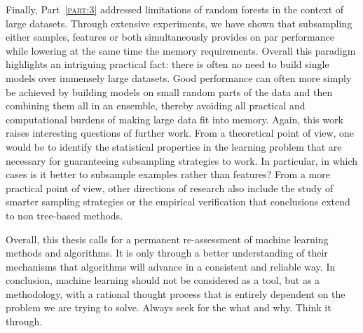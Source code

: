 Finally, Part~\textsc{\ref{part:3}} addressed limitations of random forests in
the context of large datasets. Through extensive experiments, we have shown
that subsampling either samples, features or both simultaneously provides on
par performance while lowering at the same time the memory requirements.
Overall this paradigm highlights an intriguing practical fact: there is often
no need to build single models over immensely large datasets. Good performance
can often more simply be achieved by building models on small random parts of the
data and then combining them all in an ensemble, thereby avoiding all practical and
computational burdens of making large data fit into memory. Again, this work
raises interesting questions of further work. From a theoretical point of view,
one would be to identify the statistical properties in the learning problem
that are necessary for guaranteeing subsampling strategies to work. In
particular, in which cases is it better to subsample examples rather than
features? From a more practical point of view, other directions of research
also include the study of smarter sampling strategies or the empirical
verification that conclusions extend to non tree-based methods.

Overall, this thesis calls for a permanent re-assessment of machine learning
methods and algorithms. It is only through a better understanding of their
mechanisms that algorithms will advance in a consistent and reliable way.  In
conclusion, machine learning should not be considered as a tool, but as a
methodology, with a rational thought process that is entirely dependent on the
problem we are trying to solve. Always seek for the what and why. Think it
through.
